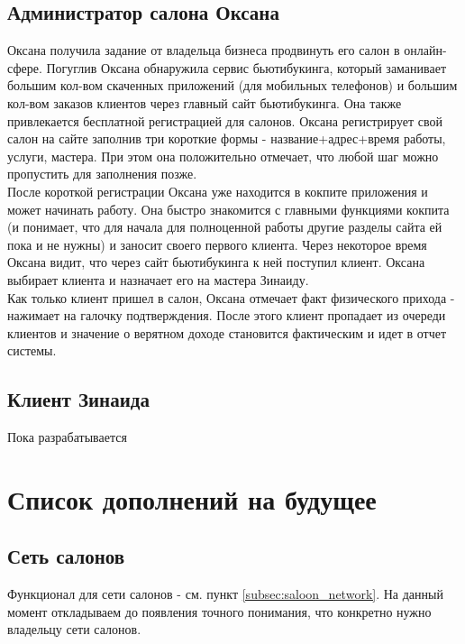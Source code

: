 \documentclass[DIV=calc, paper=a4, fontsize=11pt]{scrartcl} %
\begin{document}
\begin{framed}
    \subsection{Администратор салона Оксана}
    Оксана получила задание от владельца бизнеса продвинуть его салон в онлайн-сфере. Погуглив Оксана обнаружила сервис бьютибукинга, который заманивает большим кол-вом скаченных приложений (для мобильных телефонов) и большим кол-вом заказов клиентов через главный сайт бьютибукинга. Она также привлекается бесплатной регистрацией для салонов. Оксана регистрирует свой салон на сайте заполнив три короткие формы - название+адрес+время работы, услуги, мастера. При этом она положительно отмечает, что любой шаг можно пропустить для заполнения позже. 
    \\[0.5cm]
    После короткой регистрации Оксана уже находится в кокпите приложения и может начинать работу. Она быстро знакомится с главными функциями кокпита (и понимает, что для начала для полноценной работы другие разделы сайта ей пока и не нужны) и заносит своего первого клиента. Через некоторое время Оксана видит, что через сайт бьютибукинга к ней поступил клиент. Оксана выбирает клиента и назначает его на мастера Зинаиду. 
    \\[0.5cm]
    Как только клиент пришел в салон, Оксана отмечает факт физического прихода - нажимает на галочку подтверждения. После этого клиент пропадает из очереди клиентов и значение о верятном доходе становится фактическим и идет в отчет системы.
    
\end{framed}

\begin{framed}
    \subsection{Клиент Зинаида}
    Пока разрабатывается
\end{framed}


\section{Список дополнений на будущее}

\subsection{Сеть салонов}
Функционал для сети салонов - см. пункт \ref{subsec:saloon_network}. На данный момент откладываем до появления точного понимания, что конкретно нужно владельцу сети салонов.
\end{document}

